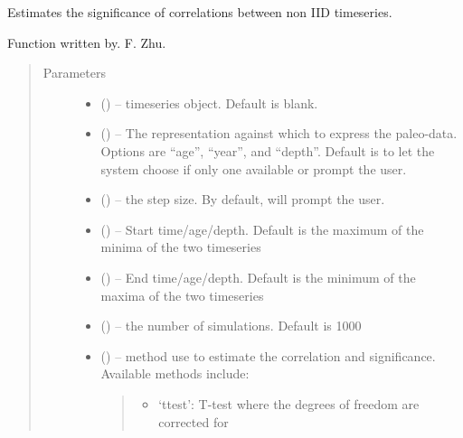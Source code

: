\documentclass[letterpaper,10pt,english]{sphinxmanual}
\begin{document}
\begin{fulllineitems}
\label{\detokenize{Main:pyleoclim.corrSigTs}}
Estimates the significance of correlations between non IID timeseries.

Function written by. F. Zhu.
\begin{quote}\begin{description}
\item[{Parameters}] \leavevmode\begin{itemize}
\item {} 
 (\sphinxstyleliteralemphasis{,}\sphinxstyleliteralemphasis{}) -- timeseries object. Default is blank.

\item {} 
 () -- The representation against which to express the
paleo-data. Options are ``age'', ``year'', and ``depth''.
Default is to let the system choose if only one available
or prompt the user.

\item {} 
 () -- the step size. By default, will prompt the user.

\item {} 
 () -- Start time/age/depth. Default is the maximum of
the minima of the two timeseries

\item {} 
 () -- End time/age/depth. Default is the minimum of the
maxima of the two timeseries

\item {} 
 () -- the number of simulations. Default is 1000

\item {} 
 () -- 
method use to estimate the correlation and significance.
Available methods include:
\begin{quote}
\begin{itemize}
\item {} 
`ttest': T-test where the degrees of freedom are corrected for


\end{itemize}
\end{quote}
\end{itemize}
\end{description}
\end{quote}
\end{fulllineitems}
\end{document}
